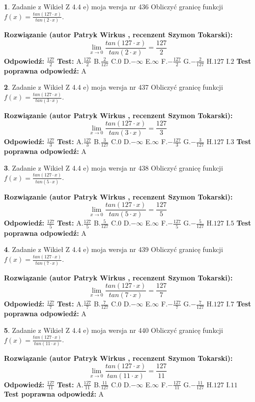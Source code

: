 \documentclass[12pt, a4paper]{article}
\theoremstyle{definition} %
\newtheorem{zad}{}
\newcommand{\zadStart}[1]{\begin{zad}#1\newline}
\newcommand{\zadStop}{\end{zad}}
\newcommand{\rozwStart}[2]{\noindent \textbf{Rozwiązanie (autor #1 , recenzent #2): }\newline}
\newcommand{\rozwStop}{\newline}
\newcommand{\odpStart}{\noindent \textbf{Odpowiedź:}\newline}
\newcommand{\odpStop}{\newline}
\newcommand{\testStart}{\noindent \textbf{Test:}\newline}
\newcommand{\testStop}{\newline}
\newcommand{\kluczStart}{\noindent \textbf{Test poprawna odpowiedź:}\newline}
\newcommand{\kluczStop}{\newline}
\begin{document}
\zadStart{Zadanie z Wikieł Z 4.4 e) moja wersja nr 436}
Obliczyć granicę funkcji $f(x)=\frac{tan(127\cdot x)}{tan(2\cdot x)}$.
\zadStop
\rozwStart{Patryk Wirkus}{Szymon Tokarski}
$$\lim\limits_{x\to 0}\frac{tan(127\cdot x)}{tan(2\cdot x)}=
\frac{127}{2}$$
\rozwStop
\odpStart
$\frac{127}{2}$
\odpStop
\testStart
A.$\frac{127}{2}$
B.$\frac{2}{127}$
C.$0$
D.$-\infty$
E.$\infty$
F.$-\frac{127}{2}$
G.$-\frac{2}{127}$
H.$127$
I.$2$
\testStop
\kluczStart
A
\kluczStop



\zadStart{Zadanie z Wikieł Z 4.4 e) moja wersja nr 437}
Obliczyć granicę funkcji $f(x)=\frac{tan(127\cdot x)}{tan(3\cdot x)}$.
\zadStop
\rozwStart{Patryk Wirkus}{Szymon Tokarski}
$$\lim\limits_{x\to 0}\frac{tan(127\cdot x)}{tan(3\cdot x)}=
\frac{127}{3}$$
\rozwStop
\odpStart
$\frac{127}{3}$
\odpStop
\testStart
A.$\frac{127}{3}$
B.$\frac{3}{127}$
C.$0$
D.$-\infty$
E.$\infty$
F.$-\frac{127}{3}$
G.$-\frac{3}{127}$
H.$127$
I.$3$
\testStop
\kluczStart
A
\kluczStop



\zadStart{Zadanie z Wikieł Z 4.4 e) moja wersja nr 438}
Obliczyć granicę funkcji $f(x)=\frac{tan(127\cdot x)}{tan(5\cdot x)}$.
\zadStop
\rozwStart{Patryk Wirkus}{Szymon Tokarski}
$$\lim\limits_{x\to 0}\frac{tan(127\cdot x)}{tan(5\cdot x)}=
\frac{127}{5}$$
\rozwStop
\odpStart
$\frac{127}{5}$
\odpStop
\testStart
A.$\frac{127}{5}$
B.$\frac{5}{127}$
C.$0$
D.$-\infty$
E.$\infty$
F.$-\frac{127}{5}$
G.$-\frac{5}{127}$
H.$127$
I.$5$
\testStop
\kluczStart
A
\kluczStop



\zadStart{Zadanie z Wikieł Z 4.4 e) moja wersja nr 439}
Obliczyć granicę funkcji $f(x)=\frac{tan(127\cdot x)}{tan(7\cdot x)}$.
\zadStop
\rozwStart{Patryk Wirkus}{Szymon Tokarski}
$$\lim\limits_{x\to 0}\frac{tan(127\cdot x)}{tan(7\cdot x)}=
\frac{127}{7}$$
\rozwStop
\odpStart
$\frac{127}{7}$
\odpStop
\testStart
A.$\frac{127}{7}$
B.$\frac{7}{127}$
C.$0$
D.$-\infty$
E.$\infty$
F.$-\frac{127}{7}$
G.$-\frac{7}{127}$
H.$127$
I.$7$
\testStop
\kluczStart
A
\kluczStop



\zadStart{Zadanie z Wikieł Z 4.4 e) moja wersja nr 440}
Obliczyć granicę funkcji $f(x)=\frac{tan(127\cdot x)}{tan(11\cdot x)}$.
\zadStop
\rozwStart{Patryk Wirkus}{Szymon Tokarski}
$$\lim\limits_{x\to 0}\frac{tan(127\cdot x)}{tan(11\cdot x)}=
\frac{127}{11}$$
\rozwStop
\odpStart
$\frac{127}{11}$
\odpStop
\testStart
A.$\frac{127}{11}$
B.$\frac{11}{127}$
C.$0$
D.$-\infty$
E.$\infty$
F.$-\frac{127}{11}$
G.$-\frac{11}{127}$
H.$127$
I.$11$
\testStop
\kluczStart
A
\kluczStop
\end{document}
